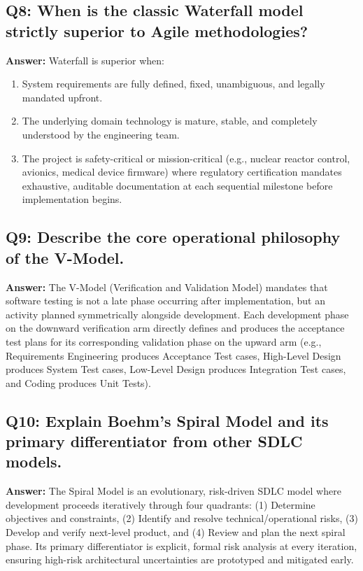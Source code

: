 \subsection*{Q8: When is the classic Waterfall model strictly superior to Agile methodologies?}
\textbf{Answer:} Waterfall is superior when:
\begin{enumerate}[label=\arabic*.]
    \item System requirements are fully defined, fixed, unambiguous, and legally mandated upfront.
    \item The underlying domain technology is mature, stable, and completely understood by the engineering team.
    \item The project is safety-critical or mission-critical (e.g., nuclear reactor control, avionics, medical device firmware) where regulatory certification mandates exhaustive, auditable documentation at each sequential milestone before implementation begins.
\end{enumerate}

\subsection*{Q9: Describe the core operational philosophy of the V-Model.}
\textbf{Answer:} The V-Model (Verification and Validation Model) mandates that software testing is not a late phase occurring after implementation, but an activity planned symmetrically alongside development. Each development phase on the downward verification arm directly defines and produces the acceptance test plans for its corresponding validation phase on the upward arm (e.g., Requirements Engineering produces Acceptance Test cases, High-Level Design produces System Test cases, Low-Level Design produces Integration Test cases, and Coding produces Unit Tests).

\subsection*{Q10: Explain Boehm's Spiral Model and its primary differentiator from other SDLC models.}
\textbf{Answer:} The Spiral Model is an evolutionary, risk-driven SDLC model where development proceeds iteratively through four quadrants: (1) Determine objectives and constraints, (2) Identify and resolve technical/operational risks, (3) Develop and verify next-level product, and (4) Review and plan the next spiral phase. Its primary differentiator is explicit, formal risk analysis at every iteration, ensuring high-risk architectural uncertainties are prototyped and mitigated early.

